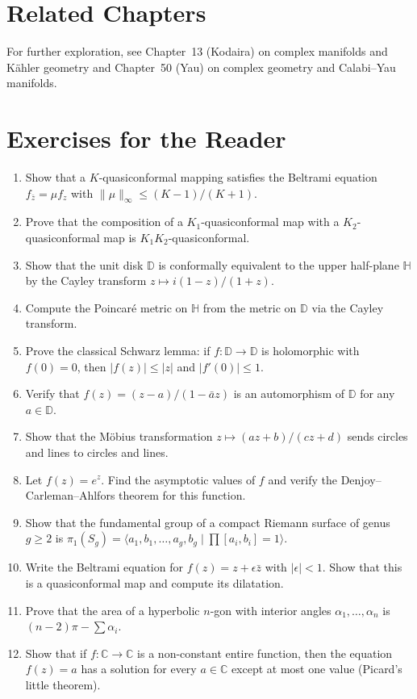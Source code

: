\section{Related Chapters}
For further exploration, see Chapter~13 (Kodaira) on complex manifolds and K\"ahler geometry and Chapter~50 (Yau) on complex geometry and Calabi--Yau manifolds.

\section*{Exercises for the Reader}

\begin{enumerate}
    \item [I] Show that a $K$-quasiconformal mapping satisfies the Beltrami equation $f_{\bar z} = \mu f_z$ with $\|\mu\|_\infty \leq (K-1)/(K+1)$.
    \item [B] Prove that the composition of a $K_1$-quasiconformal map with a $K_2$-quasiconformal map is $K_1 K_2$-quasiconformal.
    \item [B] Show that the unit disk $\mathbb{D}$ is conformally equivalent to the upper half-plane $\mathbb{H}$ by the Cayley transform $z \mapsto i(1-z)/(1+z)$.
    \item [B] Compute the Poincar{\'e} metric on $\mathbb{H}$ from the metric on $\mathbb{D}$ via the Cayley transform.
    \item [B] Prove the classical Schwarz lemma: if $f: \mathbb{D} \to \mathbb{D}$ is holomorphic with $f(0) = 0$, then $|f(z)| \leq |z|$ and $|f'(0)| \leq 1$.
    \item [B] Verify that $f(z) = (z - a)/(1 - \bar a z)$ is an automorphism of $\mathbb{D}$ for any $a \in \mathbb{D}$.
    \item [B] Show that the M\"{o}bius transformation $z \mapsto (az+b)/(cz+d)$ sends circles and lines to circles and lines.
    \item [I] Let $f(z) = e^z$. Find the asymptotic values of $f$ and verify the Denjoy--Carleman--Ahlfors theorem for this function.
    \item [B] Show that the fundamental group of a compact Riemann surface of genus $g \geq 2$ is $\pi_1(S_g) = \langle a_1,b_1,\dots,a_g,b_g \mid \prod [a_i,b_i] = 1 \rangle$.
    \item [B] Write the Beltrami equation for $f(z) = z + \epsilon \bar z$ with $|\epsilon| < 1$. Show that this is a quasiconformal map and compute its dilatation.
    \item [I] Prove that the area of a hyperbolic $n$-gon with interior angles $\alpha_1,\dots,\alpha_n$ is $(n-2)\pi - \sum \alpha_i$.
    \item [I] Show that if $f: \mathbb{C} \to \mathbb{C}$ is a non-constant entire function, then the equation $f(z) = a$ has a solution for every $a \in \mathbb{C}$ except at most one value (Picard's little theorem).
\end{enumerate}

